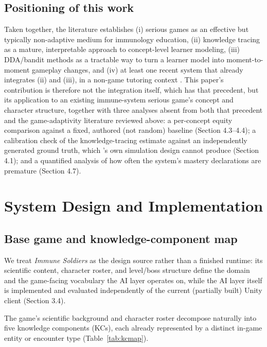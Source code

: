 \documentclass[11pt]{article}
\begin{document}
\subsection{Positioning of this work}

Taken together, the literature establishes (i) serious games as an effective but typically non-adaptive medium for immunology education, (ii) knowledge tracing as a mature, interpretable approach to concept-level learner modeling, (iii) DDA/bandit methods as a tractable way to turn a learner model into moment-to-moment gameplay changes, and (iv) at least one recent system that already integrates (ii) and (iii), in a non-game tutoring context \cite{ref39}. This paper's contribution is therefore not the integration itself, which has that precedent, but its application to an existing immune-system serious game's concept and character structure, together with three analyses absent from both that precedent and the game-adaptivity literature reviewed above: a per-concept equity comparison against a fixed, authored (not random) baseline (Section 4.3--4.4); a calibration check of the knowledge-tracing estimate against an independently generated ground truth, which \cite{ref39}'s own simulation design cannot produce (Section 4.1); and a quantified analysis of how often the system's mastery declarations are premature (Section 4.7).

\section{System Design and Implementation}

\subsection{Base game and knowledge-component map}

We treat \textit{Immune Soldiers} \cite{ref9} as the design source rather than a finished runtime: its scientific content, character roster, and level/boss structure define the domain and the game-facing vocabulary the AI layer operates on, while the AI layer itself is implemented and evaluated independently of the current (partially built) Unity client (Section 3.4).

The game's scientific background \cite{ref9} and character roster decompose naturally into five knowledge components (KCs), each already represented by a distinct in-game entity or encounter type (Table~\ref{tab:kcmap}).
\end{document}
